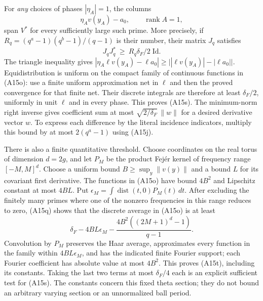 \documentclass[11pt]{article}
\theoremstyle{definition}\newtheorem{definition}[theorem]{Definition}\newtheorem{remark}[theorem]{Remark}
\begin{document}
For \emph{any} choices of phases $|\eta_A|=1$, the columns
\[
                 \eta_Av(y_A)-a_0,
                 \qquad \operatorname{rank}A=1,
 \tag{A15r}
\]
span $V^*$ for every sufficiently large such prime.  More precisely,
if $R_q=(q^a-1)(q^b-1)/(q-1)$ is their number, their matrix $J_q$
satisfies
\[
             J_qJ_q^*\ \ge\ R_q\delta_F/2\;\mathrm{Id}.
 \tag{A15s}
\]
The triangle inequality gives
$|\eta_A\ell v(y_A)-\ell a_0|
 \ge\bigl||\ell v(y_A)|-|\ell a_0|\bigr|$.
Equidistribution is uniform on the compact family of continuous
functions in (A15o): use a finite uniform approximation net in
$\ell$ and then the proved convergence for that finite net.
Their discrete integrals are therefore at least $\delta_F/2$,
uniformly in unit $\ell$ and in every phase.  This proves (A15s).
The minimum-norm right inverse gives coefficient sum at most
$\sqrt{2/\delta_F}\,\|w\|$ for a desired derivative vector $w$.
To express each difference by the literal incidence indicators,
multiply this bound by at most $2(q^a-1)$ using (A15j).

There is also a finite quantitative threshold.  Choose coordinates
on the real torus of dimension $d=2g$, and let $P_M$ be the product
Fej\'er kernel of frequency range $[-M,M]^d$.  Choose a uniform
bound $B\ge\sup_y\|v(y)\|$ and a bound $L$ for its covariant first
derivative.  The functions in (A15o) have bound $4B^2$ and
Lipschitz constant at most $4BL$.  Put
$\epsilon_M=\int\operatorname{dist}(t,0)P_M(t)\,dt$.
After excluding the finitely many primes where one of the nonzero
frequencies in this range reduces to zero, (A15q) shows that the
discrete average in (A15o) is at least
\[
 \delta_F-4BL\epsilon_M
       -\frac{4B^2((2M+1)^d-1)}{q-1}.
 \tag{A15t}
\]
Convolution by $P_M$ preserves the Haar average, approximates every
function in the family within $4BL\epsilon_M$, and has the
indicated finite Fourier support; each Fourier coefficient has
absolute value at most $4B^2$.  This proves (A15t), including its
constants.  Taking the last two terms at most $\delta_F/4$ each
is an explicit sufficient test for (A15s).  The constants concern
this fixed theta section; they do not bound an arbitrary varying
section or an unnormalized ball period.
\end{document}
